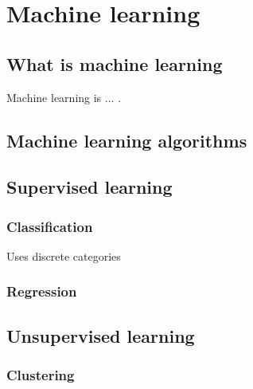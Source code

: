 
\chapter{Machine learning} %

\label{Chapter2} %

\section{What is machine learning}
Machine learning is ... .

\section{Machine learning algorithms}

\section{Supervised learning}
\subsection{Classification}
Uses discrete categories
\subsection{Regression}

\section{Unsupervised learning}
\subsection{Clustering}